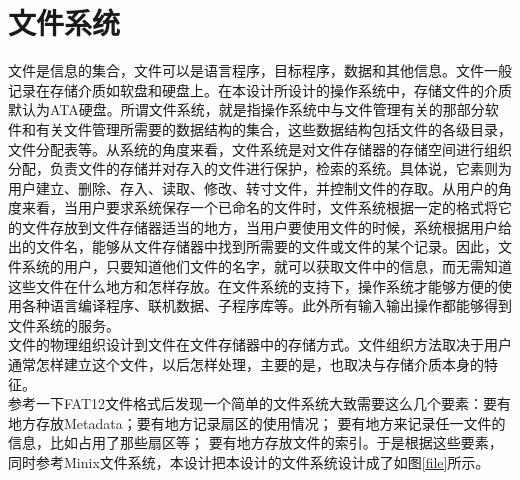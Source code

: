 \documentclass[UTF8,nofonts,cs4size]{ctexrep}
\begin{document}
\chapter{文件系统}
文件是信息的集合，文件可以是语言程序，目标程序，数据和其他信息。文件一般记录在存储介质如软盘和硬盘上。在本设计所设计的操作系统中，存储文件的介质默认为ATA硬盘。所谓文件系统，就是指操作系统中与文件管理有关的那部分软件和有关文件管理所需要的数据结构的集合，这些数据结构包括文件的各级目录，文件分配表等。从系统的角度来看，文件系统是对文件存储器的存储空间进行组织分配，负责文件的存储并对存入的文件进行保护，检索的系统。具体说，它素则为用户建立、删除、存入、读取、修改、转寸文件，并控制文件的存取。从用户的角度来看，当用户要求系统保存一个已命名的文件时，文件系统根据一定的格式将它的文件存放到文件存储器适当的地方，当用户要使用文件的时候，系统根据用户给出的文件名，能够从文件存储器中找到所需要的文件或文件的某个记录。因此，文件系统的用户，只要知道他们文件的名字，就可以获取文件中的信息，而无需知道这些文件在什么地方和怎样存放。在文件系统的支持下，操作系统才能够方便的使用各种语言编译程序、联机数据、子程序库等。此外所有输入输出操作都能够得到文件系统的服务。
\\
\indent  文件的物理组织设计到文件在文件存储器中的存储方式。文件组织方法取决于用户通常怎样建立这个文件，以后怎样处理，主要的是，也取决与存储介质本身的特征。
\\
\indent 参考一下FAT12文件格式后发现一个简单的文件系统大致需要这么几个要素：要有地方存放Metadata；要有地方记录扇区的使用情况；
要有地方来记录任一文件的信息，比如占用了那些扇区等；
要有地方存放文件的索引。于是根据这些要素，同时参考Minix文件系统，本设计把本设计的文件系统设计成了如图\ref{file}所示。
\end{document}
